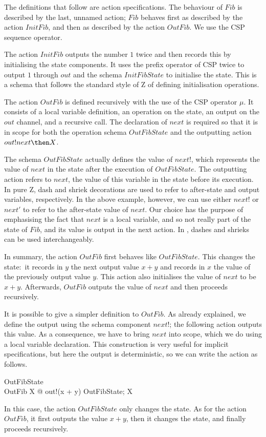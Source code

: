 \documentclass{article}
\begin{document}
The definitions that follow are action specifications.  The behaviour
of $Fib$ is described by the last, unnamed action; $Fib$ behaves first
as described by the action $InitFib$, and then as described by the
action $OutFib$.  We use the CSP sequence operator.

The action $InitFib$ outputs the number $1$ twice and then records
this by initialising the state components.  It uses the prefix
operator of CSP twice to output $1$ through $out$ and the schema
$InitFibState$ to initialise the state.  This is a schema that follows
the standard style of Z of defining initialisation operations.

The action $OutFib$ is defined recursively with the use of the CSP
operator $\mu$.  It consists of a local variable definition, an
operation on the state, an output on the $out$ channel, and a
recursive call.  The declaration of $next$ is required so that it is
in scope for both the operation schema $OutFibState$ and the
outputting action $out!next \then X$.

The schema $OutFibState$ actually defines the value of $next!  $,
which represents the value of $next$ in the state after the execution
of $OutFibState$.  The outputting action refers to $next$, the value
of this variable in the state before its execution.  In pure Z, dash
and shriek decorations are used to refer to after-state and output
variables, respectively.  In the above example, however, we can use
either $next!$ or $next'$ to refer to the after-state value of $next$.
Our choice has the purpose of emphasising the fact that $next$ is a
local variable, and so not really part of the state of $Fib$, and its
value is output in the next action.  In \Circus, dashes and shrieks
can be used interchangeably.

In summary, the action $OutFib$ first behaves like $OutFibState $.
This changes the state:~it records in $y$ the next output value $x +
y$ and records in $x$ the value of the previously output value $y$.
This action also initialises the value of $next$ to be $x + y$.
Afterwards, $OutFib$ outputs the value of $next$ and then proceeds
recursively.

It is possible to give a simpler definition to $OutFib$.  As already
explained, we define the output using the schema component $next!$;
the following action outputs this value.  As a consequence, we have to
bring $next$ into scope, which we do using a local variable
declaration.  This construction is very useful for implicit
specifications, but here the output is deterministic, so we can write
the action as follows.
\begin{zed}
  OutFibState 
  \\
  OutFib  \mu X @ out!(x + y) \then OutFibState; X
\end{zed}
In this case, the action $OutFibState$ only changes the state.  As for
the action $OutFib$, it first outputs the value $x + y$, then it
changes the state, and finally proceeds recursively.
\end{document}
